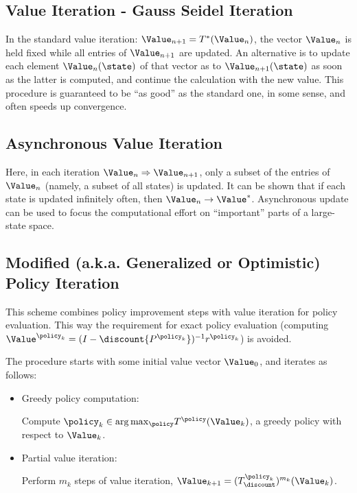 \subsection{Value Iteration - Gauss Seidel Iteration}
In the standard value iteration: ${\Value_{n + 1}} =
T_{}^*({\Value_n})$, the vector ${\Value_n}$ is held fixed while all
entries of ${\Value_{n + 1}}$ are updated. An alternative is to
update each element ${\Value_n}(\state)$ of that vector as to
${\Value_{n + 1}}(\state)$ as soon as the latter is computed, and
continue the calculation with the new value. This procedure is
guaranteed to be ``as good'' as the standard one, in some sense, and
often speeds up convergence.


\subsection{Asynchronous Value  Iteration}
Here, in each iteration ${\Value_n} \Rightarrow {\Value_{n + 1}}$,
only a subset of the entries of  ${\Value_n}$ (namely, a subset of
all states) is updated. It can be shown that if each state is
updated infinitely often, then ${\Value_n} \to {\Value^*}$.
Asynchronous update can be used to focus the computational effort on
``important'' parts of a large-state space.



\subsection{Modified (a.k.a. Generalized or Optimistic) Policy Iteration}\label{ss:mod_PI}

This scheme combines policy improvement steps with value iteration
for policy evaluation. This way the requirement for exact policy
evaluation (computing  ${\Value^{{\policy _k}}} = {(I - \discount
{P^{{\policy _k}}})^{ - 1}}{r^{{\policy _k}}}$) is avoided.

The procedure starts with some initial value vector ${\Value_0}$,
and iterates as follows:
\begin{itemize}
  \item Greedy policy computation:

Compute ${\policy _k} \in \arg {\max _\policy }T_{}^\policy
({\Value_k})$, a greedy policy with respect to ${\Value_k}$.
  \item Partial value iteration:

Perform ${m_k}$ steps of value iteration, ${\Value_{k + 1}} =
{(T_\discount ^{{\policy _k}})^{{m_k}}}({\Value_k})$.
\end{itemize}


